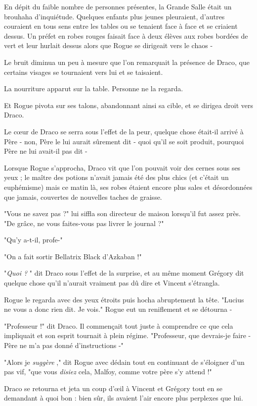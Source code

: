 En dépit du faible nombre de personnes présentes, la Grande Salle était un brouhaha d'inquiétude. Quelques enfants plus jeunes pleuraient, d'autres couraient en tous sens entre les tables ou se tenaient face à face et se criaient dessus. Un préfet en robes rouges faisait face à deux élèves aux robes bordées de vert et leur hurlait dessus alors que Rogue se dirigeait vers le chaos -

Le bruit diminua un peu à mesure que l'on remarquait la présence de Draco, que certains visages se tournaient vers lui et se taisaient.

La nourriture apparut sur la table. Personne ne la regarda.

Et Rogue pivota sur ses talons, abandonnant ainsi sa cible, et se dirigea droit vers Draco.

Le cœur de Draco se serra sous l'effet de la peur, quelque chose était-il arrivé à Père - non, Père le lui aurait sûrement dit - quoi qu'il se soit produit, pourquoi Père ne lui avait-il pas dit -

Lorsque Rogue s'approcha, Draco vit que l'on pouvait voir des cernes sous ses yeux ; le maître des potions n'avait jamais été des plus chics (et c'était un euphémisme) mais ce matin là, ses robes étaient encore plus sales et désordonnées que jamais, couvertes de nouvelles taches de graisse.

"Vous ne savez pas ?" lui siffla son directeur de maison lorsqu'il fut assez près. "De grâce, ne vous faites-vous pas livrer le journal ?"

"Qu'y a-t-il, profe-"

"On a fait sortir Bellatrix Black d'Azkaban !"

"\emph{Quoi ?} " dit Draco sous l'effet de la surprise, et au même moment Grégory dit quelque chose qu'il n'aurait vraiment pas dû dire et Vincent s'étrangla.

Rogue le regarda avec des yeux étroits puis hocha abruptement la tête. "Lucius ne vous a donc rien dit. Je vois." Rogue eut un reniflement et se détourna -

"Professeur !" dit Draco. Il commençait tout juste à comprendre ce que cela impliquait et son esprit tournait à plein régime. "Professeur, que devrais-je faire - Père ne m'a pas donné d'instructions -"

"Alors je \emph{suggère} ," dit Rogue avec dédain tout en continuant de s'éloigner d'un pas vif, "que vous \emph{disiez}  cela, Malfoy, comme votre père s'y attend !"

Draco se retourna et jeta un coup d'œil à Vincent et Grégory tout en se demandant à quoi bon : bien sûr, ils avaient l'air encore plus perplexes que lui.

